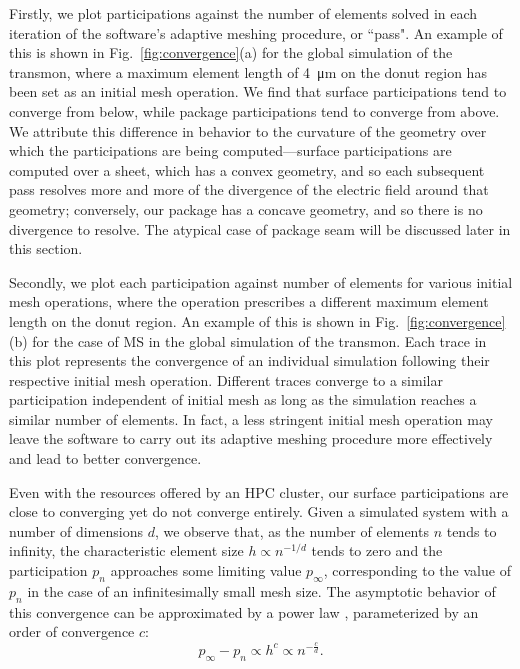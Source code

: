 \documentclass[
    reprint,
    superscriptaddress,
    amsmath,amssymb,
    aps,
    prb,
    floatfix,
]{revtex4-2}
\begin{document}
Firstly, we plot participations against the number of elements solved in each iteration of the software's adaptive meshing procedure, or ``pass". An example of this is shown in Fig.~\ref{fig:convergence}(a) for the global simulation of the transmon, where a maximum element length of \SI{4}{\micro\meter} on the donut region has been set as an initial mesh operation. We find that surface participations tend to converge from below, while package participations tend to converge from above. We attribute this difference in behavior to the curvature of the geometry over which the participations are being computed---surface participations are computed over a sheet, which has a convex geometry, and so each subsequent pass resolves more and more of the divergence of the electric field around that geometry; conversely, our package has a concave geometry, and so there is no divergence to resolve. The atypical case of package seam will be discussed later in this section.

Secondly, we plot each participation against number of elements for various initial mesh operations, where the operation prescribes a different maximum element length on the donut region. An example of this is shown in Fig.~\ref{fig:convergence}(b) for the case of MS in the global simulation of the transmon. Each trace in this plot represents the convergence of an individual simulation following their respective initial mesh operation. Different traces converge to a similar participation independent of initial mesh as long as the simulation reaches a similar number of elements. In fact, a less stringent initial mesh operation may leave the software to carry out its adaptive meshing procedure more effectively and lead to better convergence.

Even with the resources offered by an HPC cluster, our surface participations are close to converging yet do not converge entirely. Given a simulated system with a number of dimensions $d$, we observe that, as the number of elements $n$ tends to infinity, the characteristic element size $h \propto n^{-1/d}$ tends to zero and the participation $p_n$ approaches some limiting value $p_\infty$, corresponding to the value of $p_n$ in the case of an infinitesimally small mesh size. The asymptotic behavior of this convergence can be approximated by a power law \cite{roache2009}, parameterized by an order of convergence $c$:
\begin{equation}
    p_{\infty}-p_n \propto h^c \propto n^{-\frac{c}{d}}
    \label{eq:convergence}.
\end{equation}
\end{document}
